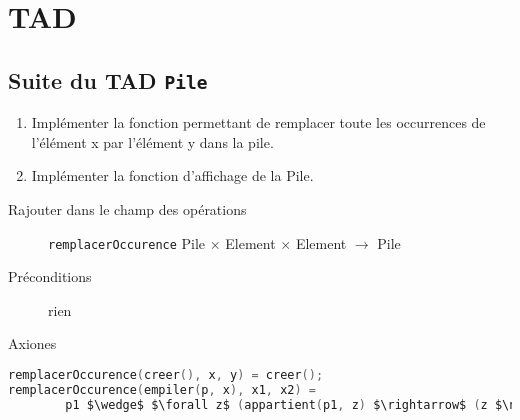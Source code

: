\section{TAD}
\subsection{Suite du TAD \texttt{Pile}}
\begin{enumerate}
	\item Implémenter la fonction permettant de remplacer toute les occurrences de l'élément x par l'élément y dans la pile.
	\item Implémenter la fonction d'affichage de la Pile.
\end{enumerate}
\begin{description}
	\item[Rajouter dans le champ des opérations] \texttt{remplacerOccurence} Pile $\times$ Element $\times$ Element $\rightarrow$ Pile
	\item[Préconditions] rien
	\item[Axiones]
\end{description}

\begin{lstlisting}[language=C]
remplacerOccurence(creer(), x, y) = creer();
remplacerOccurence(empiler(p, x), x1, x2) = 
		p1 $\wedge$ $\forall z$ (appartient(p1, z) $\rightarrow$ (z $\neq$ x1) (empiler(p, x), z') $\wedge$ z' = x1))
\end{lstlisting}




